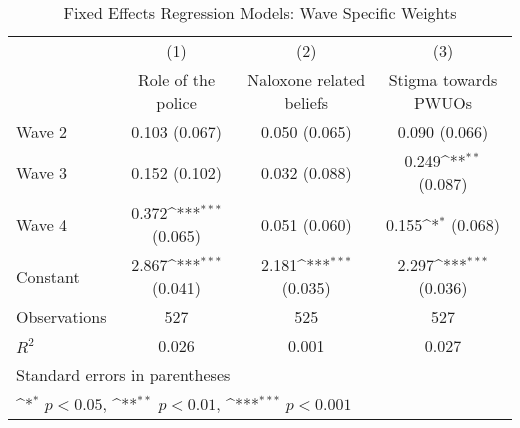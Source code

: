 \begin{table}[htbp]\centering
\def\sym#1{\ifmmode^{#1}\else\(^{#1}\)\fi}
\caption{\centering Fixed Effects Regression Models: Wave Specific Weights}
\begin{tabular}{l*{3}{c}}
\toprule
                &\multicolumn{1}{c}{(1)}&\multicolumn{1}{c}{(2)}&\multicolumn{1}{c}{(3)}\\
                &\multicolumn{1}{c}{Role of the police}&\multicolumn{1}{c}{Naloxone related beliefs}&\multicolumn{1}{c}{Stigma towards PWUOs}\\
\midrule
Wave 2          &0.103 (0.067)         &0.050 (0.065)         &0.090 (0.066)         \\
\addlinespace
Wave 3          &0.152 (0.102)         &0.032 (0.088)         &0.249\sym{**} (0.087)         \\
\addlinespace
Wave 4          &0.372\sym{***} (0.065)         &0.051 (0.060)         &0.155\sym{*} (0.068)         \\
\addlinespace
Constant        &2.867\sym{***} (0.041)         &2.181\sym{***} (0.035)         &2.297\sym{***} (0.036)         \\
\midrule
Observations    &      527         &      525         &      527         \\
\(R^{2}\)       &    0.026         &    0.001         &    0.027         \\
\bottomrule
\multicolumn{4}{l}{\footnotesize Standard errors in parentheses}\\
\multicolumn{4}{l}{\footnotesize \sym{*} \(p<0.05\), \sym{**} \(p<0.01\), \sym{***} \(p<0.001\)}\\
\end{tabular}
\end{table}

